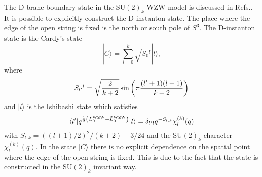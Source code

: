 \documentclass[a4paper,prd,preprint]{revtex4}
\begin{document}
The D-brane boundary state in the SU$(2)_k$ WZW model
 is discussed in Refs.\cite{Alekseev-Schomerus,FFFS}.
It is possible to explicitly construct the D-instanton state.
The place where the edge of the open string is fixed
 is the north or south pole of $S^3$.
The D-instanton state is the Cardy's state
\begin{equation}
 | C \rangle = \sum_{l=0}^k \sqrt{S_0{}^l} | l \rangle,
\label{Cardy}
\end{equation}
 where
\begin{equation}
 S_{l'}{}^l =
  \sqrt{{2 \over {k+2}}}
  \sin \left( \pi {{(l'+1)(l+1)} \over {k+2}} \right)
\end{equation}
 and $| l \rangle$ is the Ishibashi state which satisfies
\begin{equation}
 \langle l' |
  q^{{1 \over 2}
  \left( L_0^{\rm WZW} + {\tilde L}_0^{\rm WZW} \right)}
 | l \rangle
 = \delta_{l'l} q^{-S_{l,k}} \chi^{(k)}_l(q)
\end{equation}
 with $S_{l,k}=((l+1)/2)^2/(k+2)-3/24$
 and the SU$(2)_k$ character $\chi^{(k)}_l(q)$.
In the state $| C \rangle$
 there is no explicit dependence on the spatial point
 where the edge of the open string is fixed.
This is due to the fact that
 the state is constructed in the SU$(2)_k$ invariant way.
\end{document}
